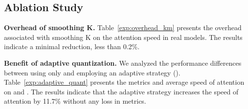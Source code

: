 \begin{table}[h!]
\vspace{-1.5em}
    \caption{Benefit of adaptive quantization.}
    \label{exp:adaptive_quant}
    \setlength\tabcolsep{3.9pt}
    \begin{center}
    \end{center}
    \vspace{-1.2em}
\end{table}



\subsection{Ablation Study}
\vspace{-.75em}
\textbf{Overhead of smoothing K.} Table~\ref{exp:overhead_km} presents the overhead associated with smoothing K on the attention speed in real models. The results indicate a minimal reduction, less than 0.2\%.



\textbf{Benefit of adaptive quantization.} We analyzed the performance differences between using only \ourt and employing an adaptive strategy (\our). Table~\ref{exp:adaptive_quant} presents the metrics and average speed of attention on \cogvideo and \llama. The results indicate that the adaptive strategy increases the speed of attention by 11.7\% without any loss in metrics.

